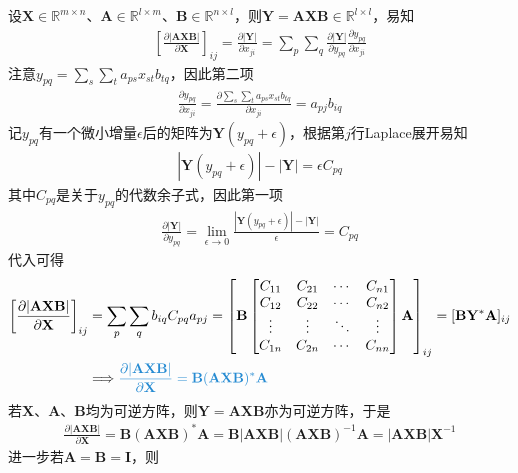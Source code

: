 \documentclass{ctexart}
\newcommand{\blue}[1]{\textcolor{Solarized-blue}{#1}}
\theoremstyle{definition}
\def \Av {\mathbf{A}}
\def \Bv {\mathbf{B}}
\def \Iv {\mathbf{I}}
\def \Xv {\mathbf{X}}
\def \Yv {\mathbf{Y}}
\def \Rbb {\mathbb{R}}
\begin{document}
设$\Xv \in \Rbb^{m \times n}$、$\Av \in \Rbb^{l \times m}$、$\Bv \in \Rbb^{n \times l}$，则$\Yv = \Av \Xv \Bv \in \Rbb^{l \times l}$，易知
\begin{align*}
    \left[ \frac{\partial |\Av \Xv \Bv|}{\partial \Xv} \right]_{ij} = \frac{\partial |\Yv|}{\partial x_{ji}} = \sum_p \sum_q \frac{\partial |\Yv|}{\partial y_{pq}}\frac{\partial y_{pq}}{\partial x_{ji}}
\end{align*}
注意$y_{pq} = \sum_s \sum_t a_{ps} x_{st} b_{tq}$，因此第二项
\begin{align*}
    \frac{\partial y_{pq}}{\partial x_{ji}} = \frac{\partial \sum_s \sum_t a_{ps} x_{st} b_{tq}}{\partial x_{ji}} = a_{pj} b_{iq}
\end{align*}
记$y_{pq}$有一个微小增量$\epsilon$后的矩阵为$\Yv(y_{pq} + \epsilon)$，根据第$j$行Laplace展开易知
\begin{align*}
    |\Yv(y_{pq} + \epsilon)| - |\Yv| = \epsilon C_{pq}
\end{align*}
其中$C_{pq}$是关于$y_{pq}$的\blue{代数余子式}，因此第一项
\begin{align*}
    \frac{\partial |\Yv|}{\partial y_{pq}} = \lim_{\epsilon \rightarrow 0} \frac{|\Yv(y_{pq} + \epsilon)| - |\Yv|}{\epsilon} = C_{pq} 
\end{align*}
代入可得
\begin{align*}
    \left[ \frac{\partial |\Av \Xv \Bv|}{\partial \Xv} \right]_{ij} & = \sum_p \sum_q b_{iq} C_{pq} a_{pj} = \left[ \Bv \begin{bmatrix}
            C_{11} & C_{21} & \cdots & C_{n1} \\
            C_{12} & C_{22} & \cdots & C_{n2} \\
            \vdots & \vdots & \ddots & \vdots \\
            C_{1n} & C_{2n} & \cdots & C_{nn}
        \end{bmatrix} \Av \right]_{ij} = [\Bv \Yv^* \Av]_{ij} \\
                                                                    & \Longrightarrow \blue{\frac{\partial |\Av \Xv \Bv|}{\partial \Xv} = \Bv (\Av \Xv \Bv)^* \Av}
\end{align*}
若$\Xv$、$\Av$、$\Bv$均为可逆方阵，则$\Yv = \Av \Xv \Bv$亦为可逆方阵，于是
\begin{align} \label{eq: determinant}
    \frac{\partial |\Av \Xv \Bv|}{\partial \Xv} = \Bv (\Av \Xv \Bv)^* \Av = \Bv |\Av \Xv \Bv| (\Av \Xv \Bv)^{-1} \Av = |\Av \Xv \Bv| \Xv^{-1}
\end{align}
进一步若$\Av = \Bv = \Iv$，则
\end{document}
